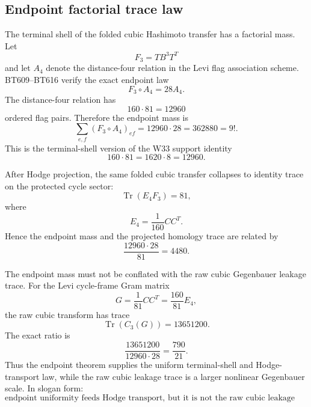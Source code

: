 
\subsection{Endpoint factorial trace law}\label{subsec:endpoint-factorial-trace-law}

The terminal shell of the folded cubic Hashimoto transfer has a factorial mass.  Let
\[
F_3=TB^3T^T
\]
and let \(A_4\) denote the distance-four relation in the Levi flag association scheme.  BT609--BT616 verify the exact endpoint law
\[
\boxed{
F_3\circ A_4=28A_4.
}
\]
The distance-four relation has
\[
\boxed{
160\cdot81=12960
}
\]
ordered flag pairs.  Therefore the endpoint mass is
\[
\boxed{
\sum_{e,f}(F_3\circ A_4)_{ef}=12960\cdot28=362880=9!.
}
\]
This is the terminal-shell version of the W33 support identity
\[
\boxed{
160\cdot81=1620\cdot8=12960.
}
\]

After Hodge projection, the same folded cubic transfer collapses to identity trace on the protected cycle sector:
\[
\boxed{
\operatorname{Tr}(E_4F_3)=81,
}
\]
where
\[
E_4=\frac1{160}CC^T.
\]
Hence the endpoint mass and the projected homology trace are related by
\[
\boxed{
\frac{12960\cdot28}{81}=4480.
}
\]

The endpoint mass must not be conflated with the raw cubic Gegenbauer leakage trace.  For the Levi cycle-frame Gram matrix
\[
G=\frac1{81}CC^T=\frac{160}{81}E_4,
\]
the raw cubic transform has trace
\[
\boxed{
\operatorname{Tr}(C_3(G))=13651200.
}
\]
The exact ratio is
\[
\boxed{
\frac{13651200}{12960\cdot28}=\frac{790}{21}.
}
\]
Thus the endpoint theorem supplies the uniform terminal-shell and Hodge-transport law, while the raw cubic leakage trace is a larger nonlinear Gegenbauer scale.  In slogan form:
\[
\boxed{
\text{endpoint uniformity feeds Hodge transport, but it is not the raw cubic leakage trace.}
}
\]
